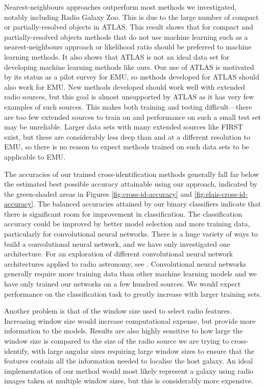   Nearest-neighbours approaches outperform most methods we investigated,
  notably including Radio Galaxy Zoo. This is due to the large number of
  compact or partially-resolved objects in ATLAS. This result shows that for
  compact and partially-resolved objects methods that do not use machine
  learning such as a nearest-neighbours approach or likelihood ratio
  \citep{weston18lrpy} should be preferred to machine learning methods. It
  also shows that ATLAS is not an ideal data set for developing machine
  learning methods like ours. Our use of ATLAS is motivated by its status as a
  pilot survey for EMU, so methods developed for ATLAS should also work for
  EMU. New methods developed should work well with extended radio sources, but
  this goal is almost unsupported by ATLAS as it has very few examples of such
  sources. This makes both training and testing difficult---there are too
  few extended sources to train on and performance on such a small test set
  may be unreliable. Larger data sets with many extended sources like FIRST
  exist, but these are considerably less deep than and at a different
  resolution to EMU, so there is no reason to expect methods trained on such
  data sets to be applicable to EMU.

  The accuracies of our trained cross-identification methods generally fall
  far below the estimated best possible accuracy attainable using our approach,
  indicated by the green-shaded areas in Figures \ref{fig:cross-id-accuracy} and
  \ref{fig:elais-cross-id-accuracy}. The balanced accuracies attained by our
  binary classifiers indicate that there is significant room for improvement
  in classification. The classification accuracy could be improved by better
  model selection and more training data, particularly for convolutional
  neural networks. There is a huge variety of ways to build a convolutional
  neural network, and we have only investigated one architecture. For an
  exploration of different convolutional neural network architectures applied
  to radio astronomy, see \citet{lukic18compact}. Convolutional neural
  networks generally require more training data than other machine learning
  models and we have only trained our networks on a few hundred sources. We
  would expect performance on the classification task to greatly increase
  with larger training sets.

  Another problem is that of the window size used to select radio features.
  Increasing window size would increase computational expense, but provide
  more information to the models. Results are also highly sensitive to how
  large the window size is compared to the size of the radio source we are
  trying to cross-identify, with large angular sizes requiring large window
  sizes to ensure that the features contain all the information needed to
  localise the host galaxy. An ideal implementation of our method would most
  likely represent a galaxy using radio images taken at multiple window
  sizes, but this is considerably more expensive.

